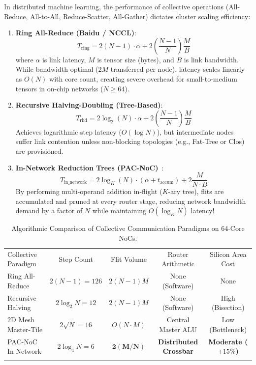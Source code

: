 In distributed machine learning, the performance of collective operations (All-Reduce, All-to-All, Reduce-Scatter, All-Gather) dictates cluster scaling efficiency:

\begin{enumerate}
    \item \textbf{Ring All-Reduce (Baidu / NCCL)}:
    \begin{equation}
    T_{\mathrm{ring}} = 2(N - 1) \cdot \alpha + 2 \left( \frac{N - 1}{N} \right) \frac{M}{B}
    \end{equation}
    where $\alpha$ is link latency, $M$ is tensor size (bytes), and $B$ is link bandwidth. While bandwidth-optimal ($2M$ transferred per node), latency scales linearly as $O(N)$ with core count, creating severe overhead for small-to-medium tensors in on-chip networks ($N \ge 64$).
    
    \item \textbf{Recursive Halving-Doubling (Tree-Based)}:
    \begin{equation}
    T_{\mathrm{rhd}} = 2 \log_2(N) \cdot \alpha + 2 \left( \frac{N - 1}{N} \right) \frac{M}{B}
    \end{equation}
    Achieves logarithmic step latency ($O(\log N)$), but intermediate nodes suffer link contention unless non-blocking topologies (e.g., Fat-Tree or Clos) are provisioned.
    
    \item \textbf{In-Network Reduction Trees (PAC-NoC)}~\cite{Ouyang2026PAC}:
    \begin{equation}
    T_{\mathrm{in\_network}} = 2 \log_K(N) \cdot (\alpha + t_{\mathrm{accum}}) + 2 \frac{M}{N \cdot B}
    \end{equation}
    By performing multi-operand addition in-flight ($K$-ary tree), flits are accumulated and pruned at every router stage, reducing network bandwidth demand by a factor of $N$ while maintaining $O(\log_K N)$ latency!
\end{enumerate}

\begin{table}[t]
\centering
\caption{Algorithmic Comparison of Collective Communication Paradigms on 64-Core NoCs.}
\label{tab:collective-comparison}
\begin{tabular}{lcccc}
\hline\noalign{\smallskip}
Collective Paradigm & Step Count & Flit Volume & Router Arithmetic & Silicon Area Cost \\
\noalign{\smallskip}\svhline\noalign{\smallskip}
Ring All-Reduce & $2(N-1) = 126$ & $2(N-1)M$ & None (Software) & None \\
Recursive Halving & $2\log_2 N = 12$ & $2(N-1)M$ & None (Software) & High (Bisection) \\
2D Mesh Master-Tile & $2\sqrt{N} = 16$ & $O(N \cdot M)$ & Central Master ALU & Low (Bottleneck) \\
PAC-NoC In-Network & $2\log_4 N = 6$ & $\mathbf{2(M/N)}$ & \textbf{Distributed Crossbar} & \textbf{Moderate ($+15\%$)} \\
\noalign{\smallskip}\hline
\end{tabular}
\end{table}

